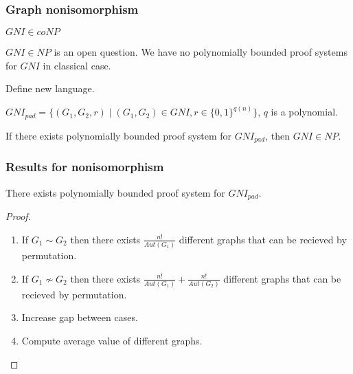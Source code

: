 \begin{frame}
    \frametitle{Graph nonisomorphism}

    $GNI \in coNP$
    
    $GNI \in NP$ is an open question. We have no polynomially bounded proof systems
    for $GNI$ in classical case.

    Define new language.

    \begin{definition}
        $GNI_{pad} = \{(G_1, G_2, r) \mid (G_1, G_2) \in GNI,
        r \in \{0, 1\}^{q(n)}\}$, $q$ is a polynomial.
    \end{definition}

    \begin{lemma}
        If there exists polynomially bounded proof system for
        $GNI_{pad}$, then $GNI \in NP$.
    \end{lemma}
\end{frame}

\begin{frame}
    \frametitle{Results for nonisomorphism}

    \begin{theorem}
        There exists polynomially bounded proof system for $GNI_{pad}$.
    \end{theorem}

    \begin{proof}
        \begin{enumerate}
	        \item If $G_1 \sim G_2$ then there exists $\frac{n!}{Aut(G_1)}$ different
		        graphs that can be recieved by permutation.
            \item If $G_1 \nsim G_2$ then there exists $\frac{n!}{Aut(G_1)} +
		        \frac{n!}{Aut(G_2)}$ different graphs that can be recieved by permutation.
            \item Increase gap between cases.
        	\item Compute average value of different graphs.
        \end{enumerate}
    \end{proof}
\end{frame}